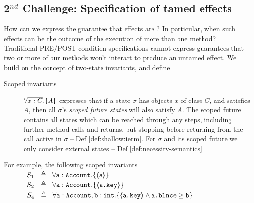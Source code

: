 \subsection{2$^{nd}$ Challenge: Specification of tamed effects}

How can we express the guarantee that effects are \tamed? %
 In particular, when such effects can be the outcome of the execution of more than one method? Traditional PRE/POST condition specifications cannot express guarantees that two or more of our methods won't interact to produce an untamed effect. 
%
We build on the concept of two-state invariants, and define

\begin{description}
\item[{Scoped invariants}] %
{$\forall {\overline{x:C}}.{{\{}}{A}{{\}}}$} expresses that if a {state} $\sigma$ 
 has objects $\overline x$ of class $\overline C$, and satisfies $A$, then all $\sigma$'s \emph{scoped  future  states} will  {also} satisfy  {$A$}. 
The scoped future  {contains all states which can be reached through any steps, including further method calls and returns, but stopping before returning} from the call active in $\sigma$ --  \cf Def  \ref{def:shallow:term}.
{For} $\sigma$ and its scoped future   we only consider external states -- \cf Def \ref{def:necessity-semantics}.
\end{description}

    
\label{s:bank}
\label{s:bankSpecEx}


\noindent
For example, the following scoped invariants\\
$\strut \SPSP  S_1\ \  \triangleq \ \ \TwoStatesN {\prg{a}:\prg{Account}}  {\inside{\prg{a}}} $ 
\\
$\strut  \SPSP  S_2\ \  \triangleq \ \ \TwoStatesN  {\prg{a}:\prg{Account}}  {\inside{\prg{a.key}}} $ 
\\
$\strut  \SPSP  S_4\ \  \triangleq \ \ \TwoStatesN{ \prg{a}:\prg{Account},\prg{b}:\prg{int} } {\inside{\prg{a.key}} \wedge \prg{a.\balance} \geq \prg{b} } $
 


